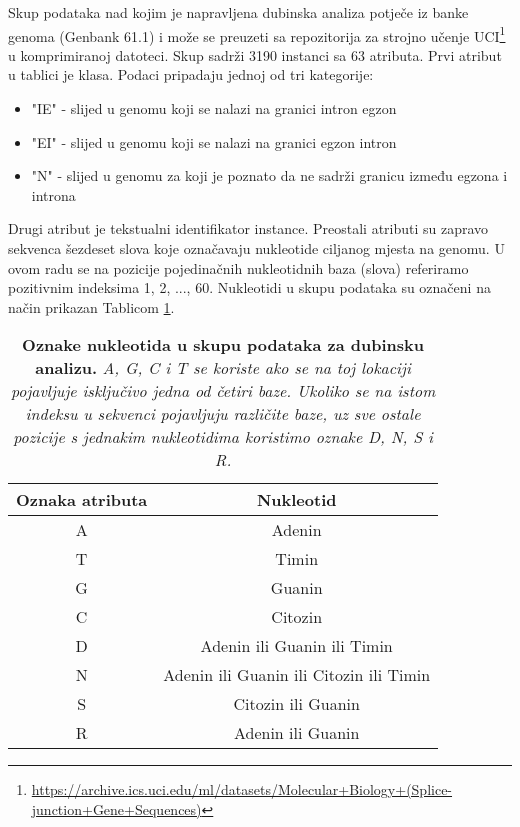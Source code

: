 Skup podataka nad kojim je napravljena dubinska analiza potječe iz banke genoma
(Genbank 61.1) i može se preuzeti sa repozitorija za strojno učenje UCI\footnote
{\url{https://archive.ics.uci.edu/ml/datasets/Molecular+Biology+(Splice-junction+Gene+Sequences)}}
u komprimiranoj datoteci. Skup sadrži 3190 instanci sa 63 atributa.
Prvi atribut u tablici je klasa. Podaci pripadaju jednoj od tri kategorije:
\begin{itemize}
   \item "IE" - slijed u genomu koji se nalazi na granici intron egzon
   \item "EI" - slijed u genomu koji se nalazi na granici egzon intron
   \item "N" - slijed u genomu za koji je poznato da ne sadrži granicu između egzona i introna
\end{itemize}
Drugi atribut je tekstualni identifikator instance.
Preostali atributi su zapravo sekvenca šezdeset slova koje označavaju nukleotide
ciljanog mjesta na genomu. U ovom radu se na pozicije pojedinačnih nukleotidnih baza (slova) referiramo pozitivnim indeksima {1, 2, ..., 60}.
Nukleotidi u skupu podataka su označeni na način prikazan Tablicom \ref{tab:oznake}.

\begin{table}[!ht]
   \caption[Oznake nukleotida u skupu podataka za dubinsku analizu]{
   \textbf{Oznake nukleotida u skupu podataka za dubinsku analizu.} \textit{A, G, C i T se koriste ako se na
   toj lokaciji pojavljuje isključivo jedna od četiri baze. Ukoliko se na istom indeksu u sekvenci
   pojavljuju različite baze, uz sve ostale pozicije s jednakim nukleotidima koristimo oznake D, N, S i R.}}
   \centering
   \begin{tabular}{||c | c ||}
   \hline
   Oznaka atributa & Nukleotid \\ [0.5ex]
   \hline\hline
   A & Adenin \\
   T & Timin \\ 
   G & Guanin \\ 
   C & Citozin \\
   D & Adenin ili Guanin ili Timin \\
   N & Adenin ili Guanin ili Citozin ili Timin \\
   S & Citozin ili Guanin \\
   R & Adenin ili Guanin \\ [1ex]
   \hline
   \end{tabular}
   \label{tab:oznake}
\end{table}
